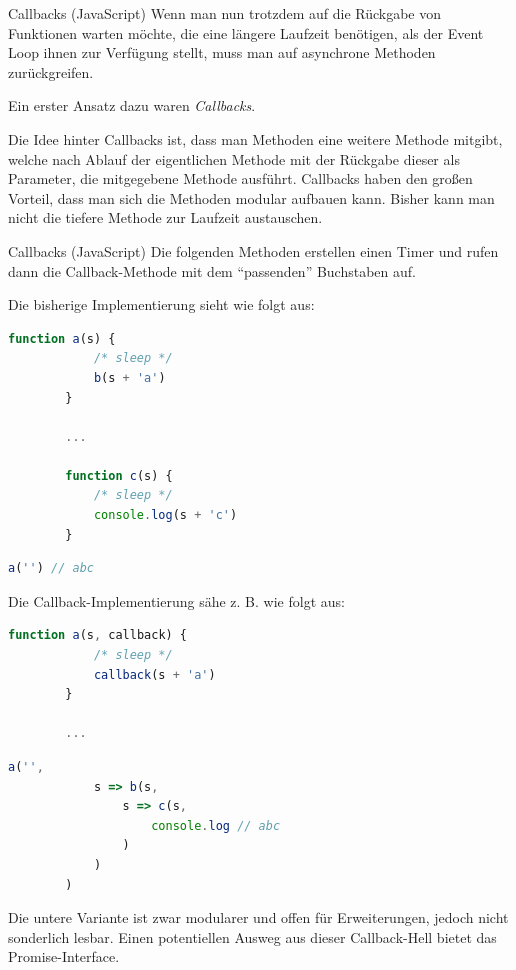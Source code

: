 \begin{defi}{Callbacks (JavaScript)}
    Wenn man nun trotzdem auf die Rückgabe von Funktionen warten möchte, die eine längere Laufzeit benötigen, als der Event Loop ihnen zur Verfügung stellt, muss man auf asynchrone Methoden zurückgreifen.

    Ein erster Ansatz dazu waren \emph{Callbacks}.

    Die Idee hinter Callbacks ist, dass man Methoden eine weitere Methode mitgibt, welche nach Ablauf der eigentlichen Methode mit der Rückgabe dieser als Parameter, die mitgegebene Methode ausführt.
    Callbacks haben den großen Vorteil, dass man sich die Methoden modular aufbauen kann.
    Bisher kann man nicht die tiefere Methode zur Laufzeit austauschen.
\end{defi}

\begin{example}{Callbacks (JavaScript)}
    Die folgenden Methoden erstellen einen Timer und rufen dann die Callback-Methode mit dem \enquote{passenden} Buchstaben auf.

    Die bisherige Implementierung sieht wie folgt aus:
    \begin{lstlisting}[language=JavaScript]
        function a(s) {
            /* sleep */
            b(s + 'a')
        }

        ...

        function c(s) {
            /* sleep */
            console.log(s + 'c')
        }
    \end{lstlisting}

    \begin{lstlisting}[language=JavaScript]
        a('') // abc
    \end{lstlisting}

    Die Callback-Implementierung sähe z. B. wie folgt aus:
    \begin{lstlisting}[language=JavaScript]
        function a(s, callback) {
            /* sleep */
            callback(s + 'a')
        }

        ...
    \end{lstlisting}

    \begin{lstlisting}[language=JavaScript]
        a('',
            s => b(s,
                s => c(s, 
                    console.log // abc
                )
            )
        )
    \end{lstlisting}

    Die untere Variante ist zwar modularer und offen für Erweiterungen, jedoch nicht sonderlich lesbar.
    Einen potentiellen Ausweg aus dieser Callback-Hell bietet das Promise-Interface.
\end{example}

